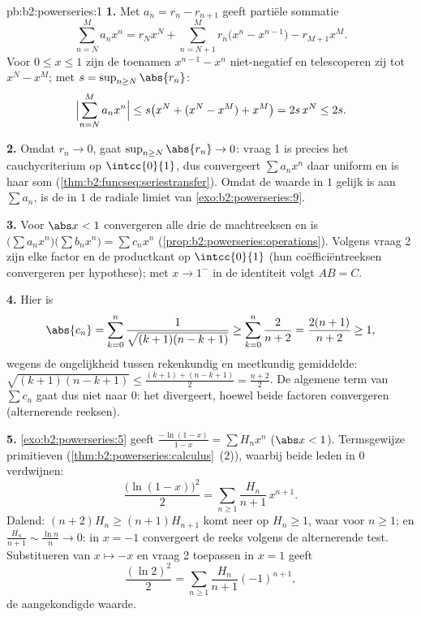 \begin{solution}{pb:b2:powerseries:1}
\textbf{1.} Met $a_n = r_n - r_{n+1}$ geeft partiële sommatie
\[
\sum_{n=N}^{M} a_nx^n
= r_Nx^N + \sum_{n=N+1}^{M} r_n\bigl(x^n - x^{n-1}\bigr)
- r_{M+1}x^M .
\]
Voor $0 \leq x \leq 1$ zijn de toenamen $x^{n-1} - x^n$
niet-negatief en telescoperen zij tot $x^N - x^M$; met $s =
\sup_{n\geq N}\abs{r_n}$:
\[
\Bigl|\sum_{n=N}^{M}a_nx^n\Bigr|
\leq s\bigl(x^N + (x^N - x^M) + x^M\bigr) = 2s\,x^N \leq 2s .
\]

\textbf{2.} Omdat $r_n \to 0$, gaat $\sup_{n\geq N}\abs{r_n} \to
0$: vraag 1 is precies het  cauchycriterium op
$\intcc{0}{1}$, dus convergeert $\sum a_nx^n$ daar uniform en is
haar som  (\cref{thm:b2:funcseq:seriestransfer}). Omdat de
waarde in $1$ gelijk is aan $\sum a_n$, is de  in $1$
de radiale limiet van \cref{exo:b2:powerseries:9}.

\textbf{3.} Voor $\abs x < 1$ convergeren alle drie de
machtreeksen  en is $\bigl(\sum a_nx^n\bigr)\bigl(\sum
b_nx^n\bigr) = \sum c_nx^n$
(\cref{prop:b2:powerseries:operations}). Volgens vraag 2 zijn elke
factor en de productkant  op $\intcc{0}{1}$ (hun
coëfficiëntreeksen convergeren per hypothese); met $x \to 1^-$ in
de identiteit volgt $AB = C$.

\textbf{4.} Hier is
\[
\abs{c_n} = \sum_{k=0}^{n}
\frac{1}{\sqrt{(k+1)(n-k+1)}}
\geq \sum_{k=0}^{n}\frac{2}{n+2}
= \frac{2(n+1)}{n+2} \geq 1,
\]
wegens de ongelijkheid tussen rekenkundig en meetkundig
gemiddelde: $\sqrt{(k+1)(n-k+1)} \leq \frac{(k+1) + (n-k+1)}{2} =
\frac{n+2}{2}$. De algemene term van $\sum c_n$ gaat dus niet naar
$0$: het  divergeert, hoewel beide factoren
convergeren (alternerende reeksen).

\textbf{5.} \cref{exo:b2:powerseries:5} geeft
$\frac{-\ln(1-x)}{1-x} = \sum H_nx^n$ ($\abs x < 1$). Termsgewijze
primitieven (\cref{thm:b2:powerseries:calculus}~(2)), waarbij
beide leden in $0$ verdwijnen:
\[
\frac{\bigl(\ln(1-x)\bigr)^2}{2}
= \sum_{n\geq1}\frac{H_n}{n+1}\,x^{n+1} .
\]
Dalend: $(n+2)H_n \geq (n+1)H_{n+1}$ komt neer op $H_n \geq 1$,
waar voor $n \geq 1$; en $\frac{H_n}{n+1} \sim \frac{\ln n}{n} \to
0$: in $x = -1$ convergeert de reeks volgens de alternerende test.
Substitueren van $x \mapsto -x$ en vraag 2 toepassen in $x = 1$
geeft
\[
\frac{(\ln 2)^2}{2}
= \sum_{n\geq1}\frac{H_n}{n+1}(-1)^{n+1},
\]
de aangekondigde waarde.


\end{solution}
